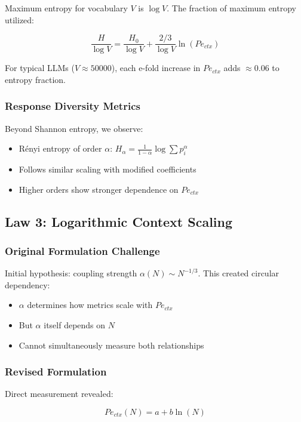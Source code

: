 \documentclass[conference]{IEEEtran}
\begin{document}
Maximum entropy for vocabulary $V$ is $\log V$. The fraction of maximum entropy utilized:

\begin{equation}
\frac{H}{\log V} = \frac{H_0}{\log V} + \frac{2/3}{\log V}\ln(Pe_{ctx})
\end{equation}

For typical LLMs ($V \approx 50000$), each e-fold increase in $Pe_{ctx}$ adds $\approx 0.06$ to entropy fraction.

\subsubsection{Response Diversity Metrics}

Beyond Shannon entropy, we observe:
\begin{itemize}
\item Rényi entropy of order $\alpha$: $H_\alpha = \frac{1}{1-\alpha}\log\sum p_i^\alpha$
\item Follows similar scaling with modified coefficients
\item Higher orders show stronger dependence on $Pe_{ctx}$
\end{itemize}

\subsection{Law 3: Logarithmic Context Scaling}

\subsubsection{Original Formulation Challenge}

Initial hypothesis: coupling strength $\alpha(N) \sim N^{-1/3}$. This created circular dependency:
\begin{itemize}
\item $\alpha$ determines how metrics scale with $Pe_{ctx}$
\item But $\alpha$ itself depends on $N$
\item Cannot simultaneously measure both relationships
\end{itemize}

\subsubsection{Revised Formulation}

Direct measurement revealed:

\begin{equation}
Pe_{ctx}(N) = a + b\ln(N)
\end{equation}
\end{document}
